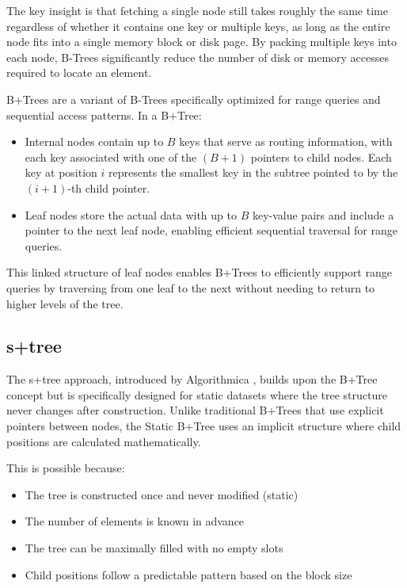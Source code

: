 The key insight is that fetching a single node still takes roughly the same time regardless of whether it contains one key or multiple keys, as long as the entire node fits into a single memory block or disk page. By packing multiple keys into each node, B-Trees significantly reduce the number of disk or memory accesses required to locate an element.

B+Trees are a variant of B-Trees specifically optimized for range queries and sequential access patterns. In a B+Tree:
\begin{itemize}
  \item Internal nodes contain up to $B$ keys that serve as routing information, with each key associated with one of the $(B+1)$ pointers to child nodes. Each key at position $i$ represents the smallest key in the subtree pointed to by the $(i+1)$-th child pointer.
  \item Leaf nodes store the actual data with up to $B$ key-value pairs and include a pointer to the next leaf node, enabling efficient sequential traversal for range queries.
\end{itemize}

This linked structure of leaf nodes enables B+Trees to efficiently support range queries by traversing from one leaf to the next without needing to return to higher levels of the tree.

\subsection{\texorpdfstring{\ac{s+tree}}{S+tree}}
\label{tb:stree}

The \ac{s+tree} approach, introduced by Algorithmica \citep{static_b_trees}, builds upon the B+Tree concept but is specifically designed for static datasets where the tree structure never changes after construction. Unlike traditional B+Trees that use explicit pointers between nodes, the Static B+Tree uses an implicit structure where child positions are calculated mathematically.

This is possible because:
\begin{itemize}
  \item The tree is constructed once and never modified (static)
  \item The number of elements is known in advance
  \item The tree can be maximally filled with no empty slots
  \item Child positions follow a predictable pattern based on the block size
\end{itemize}

